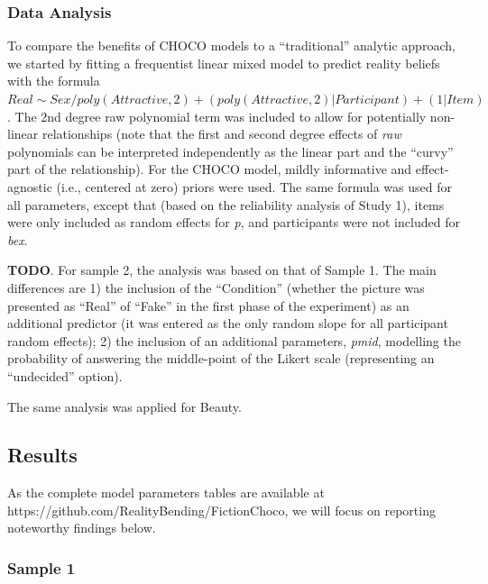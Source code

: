 \documentclass[
  jou,
  floatsintext,
  longtable,
  nolmodern,
  notxfonts,
  notimes,
  colorlinks=true,linkcolor=blue,citecolor=blue,urlcolor=blue]{apa7}
\begin{document}
\subsubsection{Data Analysis}\label{data-analysis-1}

To compare the benefits of CHOCO models to a ``traditional'' analytic
approach, we started by fitting a frequentist linear mixed model to
predict reality beliefs with the formula
\(Real\sim Sex / poly(Attractive, 2) + (poly(Attractive, 2)|Participant) + (1|Item)\).
The 2nd degree raw polynomial term was included to allow for potentially
non-linear relationships (note that the first and second degree effects
of \emph{raw} polynomials can be interpreted independently as the linear
part and the ``curvy'' part of the relationship). For the CHOCO model,
mildly informative and effect-agnostic (i.e., centered at zero) priors
were used. The same formula was used for all parameters, except that
(based on the reliability analysis of Study 1), items were only included
as random effects for \emph{p}, and participants were not included for
\emph{bex}.

\textbf{TODO}. For sample 2, the analysis was based on that of Sample 1.
The main differences are 1) the inclusion of the ``Condition'' (whether
the picture was presented as ``Real'' of ``Fake'' in the first phase of
the experiment) as an additional predictor (it was entered as the only
random slope for all participant random effects); 2) the inclusion of an
additional parameters, \emph{pmid}, modelling the probability of
answering the middle-point of the Likert scale (representing an
``undecided'' option).

The same analysis was applied for Beauty.

\subsection{Results}\label{results-1}

As the complete model parameters tables are available at
https://github.com/RealityBending/FictionChoco, we will focus on
reporting noteworthy findings below.

\subsubsection{Sample 1}\label{sample-1}
\end{document}
